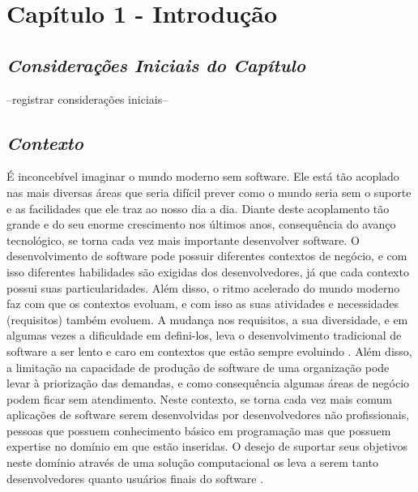\chapter[Capítulo 1 - Introdução]{Capítulo 1 - Introdução}

\section{\textit{Considerações Iniciais do Capítulo}}

--registrar considerações iniciais--

\section{\textit{Contexto}}

É inconcebível imaginar o mundo moderno sem software. Ele está tão acoplado nas mais diversas áreas que seria difícil prever como o mundo seria sem o suporte e as facilidades que ele traz ao nosso dia a dia. Diante deste acoplamento tão grande e do seu enorme crescimento nos últimos anos, consequência do avanço tecnológico, se torna cada vez mais importante desenvolver software. O desenvolvimento de software pode possuir diferentes contextos de negócio, e com isso diferentes habilidades são exigidas dos desenvolvedores, já que cada contexto possui suas particularidades. Além disso, o ritmo acelerado do mundo moderno faz com que os contextos evoluam, e com isso as suas atividades e necessidades (requisitos) também evoluem. A mudança nos requisitos, a sua diversidade, e em algumas vezes a dificuldade em defini-los, leva o desenvolvimento tradicional de software a ser lento e caro em contextos que estão sempre evoluindo \cite{lieberman2006}. Além disso, a limitação na capacidade de produção de software de uma organização pode levar à priorização das demandas, e como consequência algumas áreas de negócio podem ficar sem atendimento. Neste contexto, se torna cada vez mais comum aplicações de software serem desenvolvidas por desenvolvedores não profissionais, pessoas que possuem conhecimento básico em programação mas que possuem expertise no domínio em que estão inseridas. O desejo de suportar seus objetivos neste domínio através de uma solução computacional os leva a serem tanto desenvolvedores quanto usuários finais do software \cite{lieberman2006}. 

